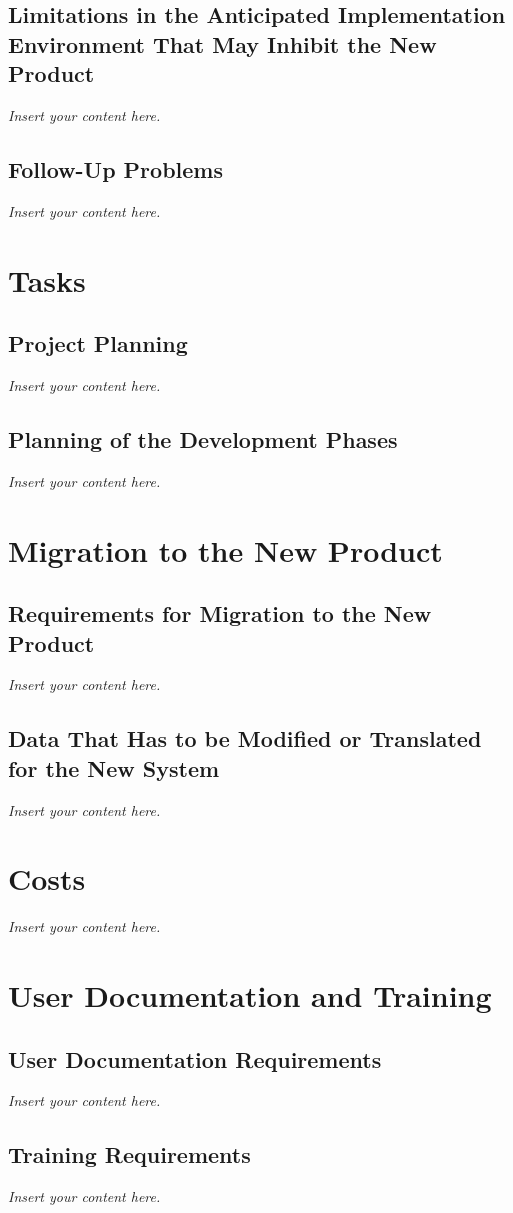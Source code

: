 \documentclass[12pt]{article}
\newcommand{\lips}{\textit{Insert your content here.}}
\begin{document}
\subsection{Limitations in the Anticipated Implementation Environment That May
Inhibit the New Product}
\lips
\subsection{Follow-Up Problems}
\lips

\section{Tasks}
\subsection{Project Planning}
\lips
\subsection{Planning of the Development Phases}
\lips

\section{Migration to the New Product}
\subsection{Requirements for Migration to the New Product}
\lips
\subsection{Data That Has to be Modified or Translated for the New System}
\lips

\section{Costs}
\lips
\section{User Documentation and Training}
\subsection{User Documentation Requirements}
\lips
\subsection{Training Requirements}
\lips
\end{document}
